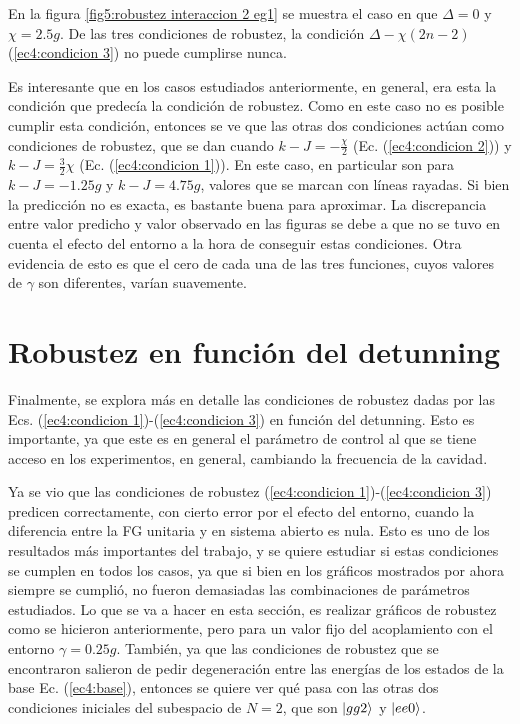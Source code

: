 En la figura \ref{fig5:robustez interaccion 2 eg1} se muestra el caso en que $\Delta=0$ y $\chi=2.5g$. De las tres condiciones de robustez, la condición $\Delta-\chi(2n-2)$ (\ref{ec4:condicion 3}) no puede cumplirse nunca. 

Es interesante que en los casos estudiados anteriormente, en general, era esta la condición que predecía la condición de robustez. Como en este caso no es posible cumplir esta condición, entonces se ve que las otras dos condiciones actúan como condiciones de robustez, que se dan cuando $k-J=-\frac{\chi}{2}$ (Ec. (\ref{ec4:condicion 2})) y $k-J=\frac{3}{2}\chi$ (Ec. (\ref{ec4:condicion 1})). En este caso, en particular son para $k-J=-1.25g$ y $k-J=4.75g$, valores que se marcan con líneas rayadas. Si bien la predicción no es exacta, es bastante buena para aproximar. La discrepancia entre valor predicho y valor observado en las figuras se debe a que no se tuvo en cuenta el efecto del entorno a la hora de conseguir estas condiciones. Otra evidencia de esto es que el cero de cada una de las tres funciones, cuyos valores de $\gamma$ son diferentes, varían suavemente. 

\section{Robustez en función del detunning}

Finalmente, se explora más en detalle las condiciones de robustez dadas por las Ecs. (\ref{ec4:condicion 1})-(\ref{ec4:condicion 3}) en función del detunning. Esto es importante, ya que este es en general el parámetro de control al que se tiene acceso en los experimentos, en general, cambiando la frecuencia de la cavidad. 

Ya se vio que las condiciones de robustez (\ref{ec4:condicion 1})-(\ref{ec4:condicion 3}) predicen correctamente, con cierto error por el efecto del entorno, cuando la diferencia entre la FG unitaria y en sistema abierto es nula. Esto es uno de los resultados más importantes del trabajo, y se quiere estudiar si estas condiciones se cumplen en todos los casos, ya que si bien en los gráficos mostrados por ahora siempre se cumplió, no fueron demasiadas las combinaciones de parámetros estudiados. Lo que se va a hacer en esta sección, es realizar gráficos de robustez como se hicieron anteriormente, pero para un valor fijo del acoplamiento con el entorno $\gamma=0.25g$. También, ya que las condiciones de robustez que se encontraron salieron de pedir degeneración entre las energías de los estados de la base Ec. (\ref{ec4:base}), entonces se quiere ver qué pasa con las otras dos condiciones iniciales del subespacio de $N=2$, que son $\ket{gg2}$ y $\ket{ee0}$.


